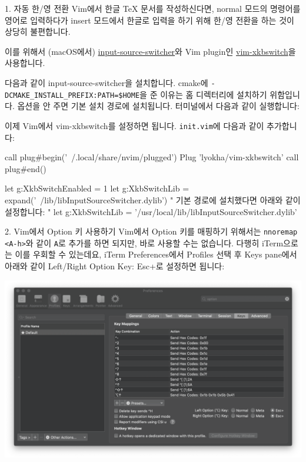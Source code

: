 \documentclass{beamer}
\begin{document}
\begin{frame}{1. 자동 한/영 전환}
  Vim에서 한글 \TeX{} 문서를 작성하신다면, normal 모드의 명령어를 영어로
  입력하다가 insert 모드에서 한글로 입력을 하기 위해 한/영 전환을 하는 것이
  상당히 불편합니다.

  이를 위해서 (macOS에서)
  \href{https://github.com/vovkasm/input-source-switcher}{input-source-switcher}와
  Vim plugin인 \href{https://github.com/lyokha/vim-xkbswitch}{vim-xkbswitch}을
  사용합니다.

  \framebreak
  다음과 같이 input-source-switcher을 설치합니다.
  cmake에 \verb/-DCMAKE_INSTALL_PREFIX:PATH=$HOME/을 준 이유는 홈 디렉터리에
  설치하기 위함입니다.
  옵션을 안 주면 기본 설치 경로에 설치됩니다.
  터미널에서 다음과 같이 실행합니다:

  \framebreak
  이제 Vim에서 vim-xkbswitch를 설정하면 됩니다.
  \verb/init.vim/에 다음과 같이 추가합니다:
  \begin{vimcode}
    call plug#begin('~/.local/share/nvim/plugged')
    Plug 'lyokha/vim-xkbswitch'
    call plug#end()

    let g:XkbSwitchEnabled = 1
    let g:XkbSwitchLib = expand('~/lib/libInputSourceSwitcher.dylib')
    " 기본 경로에 설치했다면 아래와 같이 설정합니다:
    " let g:XkbSwitchLib = '/usr/local/lib/libInputSourceSwitcher.dylib'
  \end{vimcode}
\end{frame}

\begin{frame}[fragile]{2. Vim에서 Option 키 사용하기}
  Vim에서 Option 키를 매핑하기 위해서는 \verb/nnoremap <A-h>/와 같이 \verb/A/로 
  추가를 하면 되지만, 바로 사용할 수는 없습니다.
  다행히 iTerm으로는 이를 우회할 수 있는데요, iTerm Preferences에서 Profiles
  선택 후 Keys pane에서 아래와 같이 Left/Right Option Key: Esc+로 설정하면
  됩니다:

  \begin{center}
    \includegraphics[width=0.8\linewidth]{figures/iterm-alt-setup}
  \end{center}
\end{frame}
\end{document}
